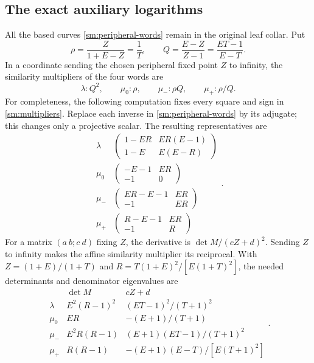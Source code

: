 \subsection{The exact auxiliary logarithms}
All the based curves \eqref{sm:peripheral-words} remain in the original
leaf collar. Put
\begin{equation}\label{sm:rho-Q}
 \rho=\frac{Z}{1+E-Z}=\frac1T,\qquad
 Q=\frac{E-Z}{Z-1}=\frac{ET-1}{E-T}.
\end{equation}
In a coordinate sending the chosen peripheral fixed point $Z$ to infinity, the
similarity multipliers of the four words are
\begin{equation}\label{sm:multipliers}
        \lambda:Q^2,\qquad \mu_0:\rho,\qquad
        \mu_-:\rho Q,\qquad \mu_+:\rho/Q.
\end{equation}
For completeness, the following computation fixes every square
and sign in \eqref{sm:multipliers}. Replace each inverse in
\eqref{sm:peripheral-words} by its adjugate; this changes only
a projective scalar. The resulting representatives are
\[
\begin{array}{c|c}
\lambda&\begin{pmatrix}1-ER&ER(E-1)\\1-E&E(E-R)\end{pmatrix}\\[2mm]
\mu_0&\begin{pmatrix}-E-1&ER\\-1&0\end{pmatrix}\\[2mm]
\mu_-&\begin{pmatrix}ER-E-1&ER\\-1&ER\end{pmatrix}\\[2mm]
\mu_+&\begin{pmatrix}R-E-1&ER\\-1&R\end{pmatrix}
\end{array}.
\]
For a matrix $(a\ b;c\ d)$ fixing $Z$, the derivative is
$\det M/(cZ+d)^2$. Sending $Z$ to infinity makes the affine
similarity multiplier its reciprocal. With
$Z=(1+E)/(1+T)$ and $R=T(1+E)^2/[E(1+T)^2]$, the needed
determinants and denominator eigenvalues are
\begin{equation}\label{sm:multiplier-calculation}
\begin{array}{c|c|c}
 &\det M&cZ+d\\\hline
\lambda&E^2(R-1)^2&(ET-1)^2/(T+1)^2\\
\mu_0&ER&-(E+1)/(T+1)\\
\mu_-&E^2R(R-1)&(E+1)(ET-1)/(T+1)^2\\
\mu_+&R(R-1)&-(E+1)(E-T)/[E(T+1)^2]
\end{array}.
\end{equation}
